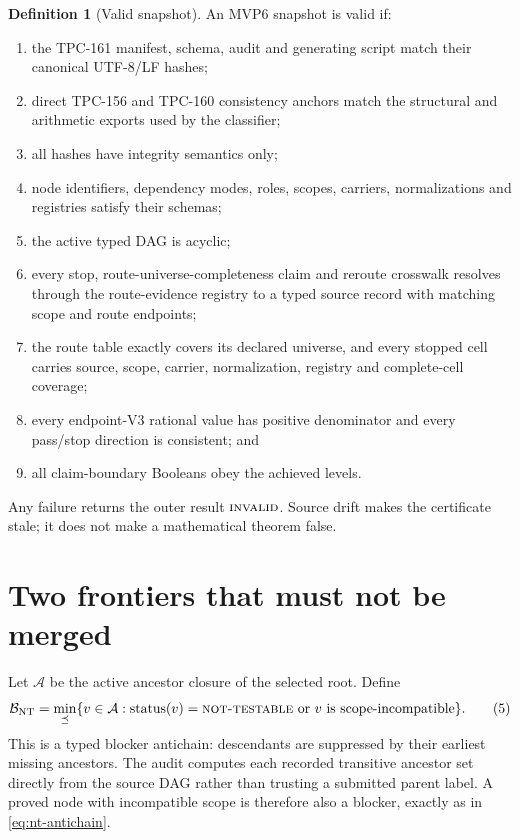 \documentclass[11pt]{article}
\theoremstyle{definition}
\newtheorem{definition}[theorem]{Definition}
\theoremstyle{remark}
\newcommand{\NT}{\textnormal{\textsc{not-testable}}}
\newcommand{\INVALID}{\textnormal{\textsc{invalid}}}
\begin{document}
\begin{definition}[Valid snapshot]
An MVP6 snapshot is valid if:
\begin{enumerate}[label=(\alph*),leftmargin=2em]
\item the TPC-161 manifest, schema, audit and generating script match
  their canonical UTF-8/LF hashes;
\item direct TPC-156 and TPC-160 consistency anchors match the
  structural and arithmetic exports used by the classifier;
\item all hashes have integrity semantics only;
\item node identifiers, dependency modes, roles, scopes, carriers,
  normalizations and registries satisfy their schemas;
\item the active typed DAG is acyclic;
\item every stop, route-universe-completeness claim and reroute
  crosswalk resolves through the route-evidence registry to a typed
  source record with matching scope and route endpoints;
\item the route table exactly covers its declared universe, and every
  stopped cell carries source, scope, carrier, normalization,
  registry and complete-cell coverage;
\item every endpoint-V3 rational value has positive denominator and
  every pass/stop direction is consistent; and
\item all claim-boundary Booleans obey the achieved levels.
\end{enumerate}
\end{definition}

Any failure returns the outer result \(\INVALID\).  Source drift makes
the certificate stale; it does not make a mathematical theorem false.

\section{Two frontiers that must not be merged}

Let \(\mathcal A\) be the active ancestor closure of the selected
root.  Define
\[
 \mathcal B_{\rm NT}
 =
 \min_{\preceq}\{v\in\mathcal A:
       \operatorname{status}(v)=\NT
       \text{ or }v\text{ is scope-incompatible}\}.
\tag{5}\label{eq:nt-antichain}
\]
This is a typed blocker antichain: descendants are suppressed by
their earliest missing ancestors.  The audit computes each recorded
transitive ancestor set directly from the source DAG rather than
trusting a submitted parent label.  A proved node with incompatible
scope is therefore also a blocker, exactly as in
\cref{eq:nt-antichain}.
\end{document}
